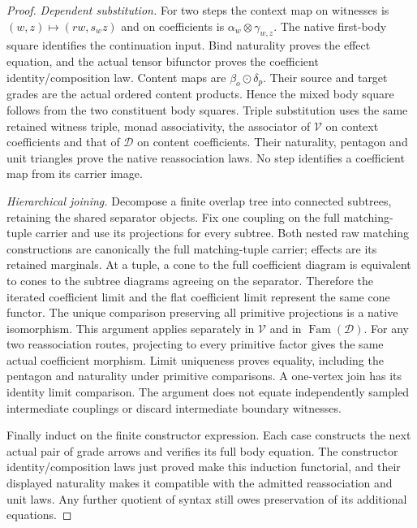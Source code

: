 \documentclass[11pt]{article}
\begin{document}
\begin{proof}
\emph{Dependent substitution.} For two steps the context map on witnesses is $(w,z)\mapsto(rw,s_wz)$ and on coefficients is $\alpha_w\otimes\gamma_{w,z}$. The native first-body square identifies the continuation input. Bind naturality proves the effect equation, and the actual tensor bifunctor proves the coefficient identity/composition law. Content maps are $\beta_o\odot\delta_p$. Their source and target grades are the actual ordered content products. Hence the mixed body square follows from the two constituent body squares. Triple substitution uses the same retained witness triple, monad associativity, the associator of $\mathcal V$ on context coefficients and that of $\mathcal D$ on content coefficients. Their naturality, pentagon and unit triangles prove the native reassociation laws. No step identifies a coefficient map from its carrier image.

\emph{Hierarchical joining.} Decompose a finite overlap tree into connected subtrees, retaining the shared separator objects. Fix one coupling on the full matching-tuple carrier and use its projections for every subtree. Both nested raw matching constructions are canonically the full matching-tuple carrier; effects are its retained marginals. At a tuple, a cone to the full coefficient diagram is equivalent to cones to the subtree diagrams agreeing on the separator. Therefore the iterated coefficient limit and the flat coefficient limit represent the same cone functor. The unique comparison preserving all primitive projections is a native isomorphism. This argument applies separately in $\mathcal V$ and in $\operatorname{Fam}(\mathcal D)$. For any two reassociation routes, projecting to every primitive factor gives the same actual coefficient morphism. Limit uniqueness proves equality, including the pentagon and naturality under primitive comparisons. A one-vertex join has its identity limit comparison. The argument does not equate independently sampled intermediate couplings or discard intermediate boundary witnesses.

Finally induct on the finite constructor expression. Each case constructs the next actual pair of grade arrows and verifies its full body equation. The constructor identity/composition laws just proved make this induction functorial, and their displayed naturality makes it compatible with the admitted reassociation and unit laws. Any further quotient of syntax still owes preservation of its additional equations.
\end{proof}
\end{document}
